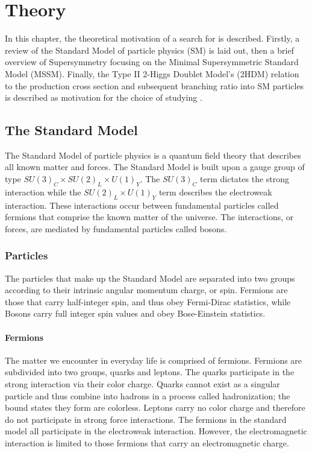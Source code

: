 \chapter{Theory}\label{sec:Theory}
    In this chapter, the theoretical motivation of a search for \HpLong is described. Firstly, a review of the Standard Model of particle physics (SM) is laid out, then a brief overview of Supersymmetry focusing on the Minimal Supersymmetric Standard Model (MSSM). Finally, the Type II 2-Higgs Doublet Model's (2HDM) relation to the \Hp production cross section and subsequent branching ratio into SM particles is described as motivation for the choice of studying \HpLong.

\section{The Standard Model}\label{sec:SM}
	 The Standard Model of particle physics is a quantum field theory that describes all known matter and forces. The Standard Model is built upon a gauge group of type $SU(3)_C \times SU(2)_L \times U(1)_Y$. The $SU(3)_C$ term dictates the strong interaction while the $SU(2)_L \times U(1)_Y$ term describes the electroweak interaction. These interactions occur between fundamental particles called fermions that comprise the known matter of the universe. The interactions, or forces, are mediated by fundamental particles called bosons. 

	\subsection{Particles}\label{ssec:Particles}
		The particles that make up the Standard Model are separated into two groups according to their intrinsic angular momentum charge, or spin. Fermions are those that carry half-integer spin, and thus obey Fermi-Dirac statistics, while Bosons carry full integer spin values and obey Bose-Einstein statistics.
		
		\subsubsection{Fermions}\label{sssec:Fermions}
			The matter we encounter in everyday life is comprised of fermions. Fermions are subdivided into two groups, quarks and leptons. The quarks participate in the strong interaction via their color charge. Quarks cannot exist as a singular particle and thus combine into hadrons in a process called hadronization; the bound states they form are colorless. Leptons carry no color charge and therefore do not participate in strong force interactions. The fermions in the standard model all participate in the electroweak interaction. However, the electromagnetic interaction is limited to those fermions that carry an electromagnetic charge.

